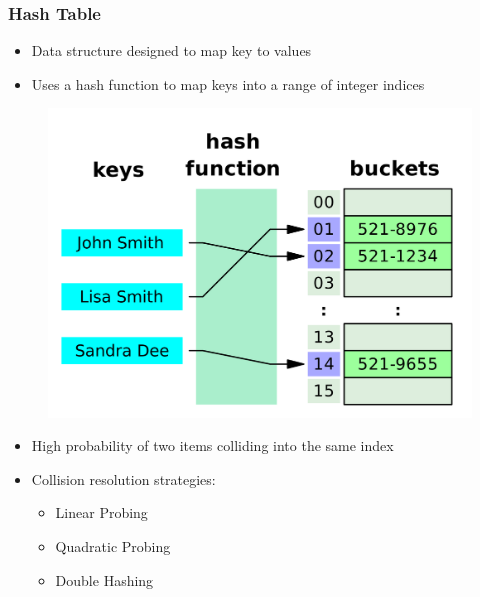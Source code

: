 \documentclass{beamer}
\begin{document}
\begin{frame}[fragile]
\frametitle{Hash Table}
	\begin{itemize}
		\item Data structure designed to map key to values
		\item Uses a hash function to map keys into a range of integer indices
	\end{itemize}
	\begin{figure}
		\centering
		\includegraphics[scale=0.05]{imgs/2.3/hash-table/hash_table.png}
	\end{figure}
	\begin{itemize}
		\item High probability of two items colliding into the same index
		\item Collision resolution strategies:
			\begin{itemize}
				\item Linear Probing
				\item Quadratic Probing
				\item Double Hashing
			\end{itemize}
	\end{itemize}
\end{frame}
\end{document}
